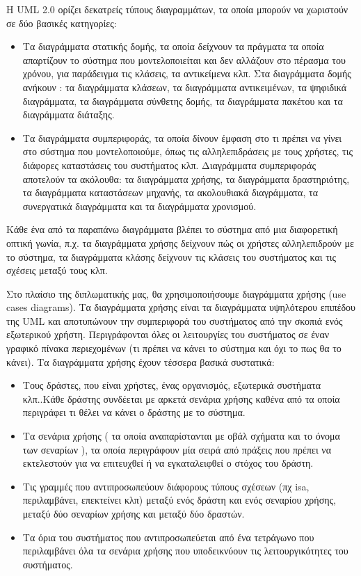 	Η UML 2.0 ορίζει δεκατρείς τύπους διαγραμμάτων, τα οποία μπορούν να χωριστούν σε δύο βασικές κατηγορίες:
	\begin{itemize}
		\item Τα διαγράμματα στατικής δομής, τα οποία δείχνουν τα πράγματα τα οποία απαρτίζουν το σύστημα που μοντελοποιείται και δεν αλλάζουν στο πέρασμα του χρόνου, για παράδειγμα τις κλάσεις, τα αντικείμενα κλπ. Στα διαγράμματα δομής ανήκουν : τα διαγράμματα κλάσεων, τα διαγράμματα αντικειμένων, τα ψηφιδικά διαγράμματα, τα διαγράμματα σύνθετης δομής, τα διαγράμματα πακέτου και τα διαγράμματα διάταξης.
		\item Τα διαγράμματα συμπεριφοράς, τα οποία δίνουν έμφαση στο τι πρέπει να γίνει στο σύστημα που μοντελοποιούμε, όπως τις αλληλεπιδράσεις με τους χρήστες, τις διάφορες καταστάσεις του συστήματος κλπ. Διαγράμματα συμπεριφοράς αποτελούν τα ακόλουθα: τα διαγράμματα χρήσης, τα διαγράμματα δραστηριότης, τα διαγράμματα καταστάσεων μηχανής, τα ακολουθιακά διαγράμματα, τα συνεργατικά διαγράμματα και τα διαγράμματα χρονισμού.
	\end{itemize}
Κάθε ένα από τα παραπάνω διαγράμματα βλέπει το σύστημα από μια διαφορετική οπτική γωνία, π.χ. τα διαγράμματα χρήσης δείχνουν πώς οι χρήστες αλληλεπιδρούν με το σύστημα, τα διαγράμματα κλάσης δείχνουν τις κλάσεις του συστήματος και τις σχέσεις μεταξύ τους κλπ.

	Στο πλαίσιο της διπλωματικής μας, θα χρησιμοποιήσουμε διαγράμματα χρήσης (use cases diagrams). Τα διαγράμματα χρήσης είναι τα διαγράμματα υψηλότερου επιπέδου της UML και αποτυπώνουν την συμπεριφορά του συστήματος από την σκοπιά ενός εξωτερικού χρήστη. Περιγράφονται όλες οι λειτουργίες του συστήματος σε έναν γραφικό πίνακα περιεχομένων (τι πρέπει να κάνει το σύστημα και όχι το πως θα το κάνει).  Τα διαγράμματα χρήσης έχουν τέσσερα βασικά συστατικά:
	
	\begin{itemize}
		\item Τους δράστες, που είναι χρήστες, ένας οργανισμός, εξωτερικά συστήματα κλπ..Κάθε δράστης συνδέεται με αρκετά σενάρια χρήσης καθένα από τα οποία περιγράφει τι θέλει να κάνει ο δράστης με το σύστημα.
		\item Τα σενάρια χρήσης ( τα οποία αναπαρίστανται με οβάλ σχήματα και το όνομα των σεναρίων ),  τα οποία περιγράφουν μία σειρά από πράξεις που πρέπει να εκτελεστούν για να επιτευχθεί ή να εγκαταλειφθεί ο στόχος του δράστη.
		\item Τις γραμμές που αντιπροσωπεύουν διάφορους τύπους σχέσεων (πχ isa, περιλαμβάνει, επεκτείνει κλπ) μεταξύ ενός δράστη και ενός σεναρίου χρήσης, μεταξύ δύο σεναρίων χρήσης και μεταξύ δύο δραστών. 
		\item Τα όρια του συστήματος που αντιπροσωπεύεται από ένα τετράγωνο που περιλαμβάνει όλα τα σενάρια χρήσης που υποδεικνύουν τις λειτουργικότητες του συστήματος. 

	\end{itemize}
	

